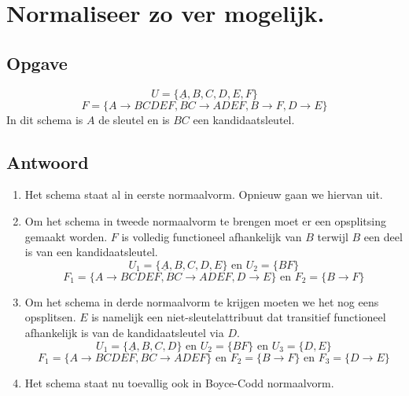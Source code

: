 \documentclass[normaalvormen.tex]{subfiles}
\begin{document}
\section{Normaliseer zo ver mogelijk.}
\subsection*{Opgave}
\[
U = \{\underline{A},B,C,D,E,F\}
\]
\[
F = \{A\rightarrow BCDEF , BC\rightarrow ADEF, B\rightarrow F, D\rightarrow E\}
\]
In dit schema is $A$ de sleutel en is $BC$ een kandidaatsleutel.

\subsection*{Antwoord}
\begin{enumerate}
\item Het schema staat al in eerste normaalvorm. Opnieuw gaan we hiervan uit.

\item Om het schema in tweede normaalvorm te brengen moet er een opsplitsing gemaakt worden. $F$ is volledig functioneel afhankelijk van $B$ terwijl $B$ een deel is van een kandidaatsleutel.
\[
U_{1} = \{\underline{A},B,C,D,E\}\text{ en } U_{2} = \{BF\}
\]
\[
F_{1} = \{A\rightarrow BCDEF , BC\rightarrow ADEF, D\rightarrow E\} \text{ en } F_{2} = \{B\rightarrow F\}
\]
\item Om het schema in derde normaalvorm te krijgen moeten we het nog eens opsplitsen. $E$ is namelijk een niet-sleutelattribuut dat transitief functioneel afhankelijk is van de kandidaatsleutel via $D$.
\[
U_{1} = \{\underline{A},B,C,D\}\text{ en } U_{2} = \{BF\} \text{ en } U_3 = \{D,E\}
\]
\[
F_{1} = \{A\rightarrow BCDEF , BC\rightarrow ADEF\} \text{ en } F_{2} = \{B\rightarrow F\} \text{ en } F_{3} = \{D\rightarrow E\}
\]
\item Het schema staat nu toevallig ook in Boyce-Codd normaalvorm.
\end{enumerate}
\end{document}
